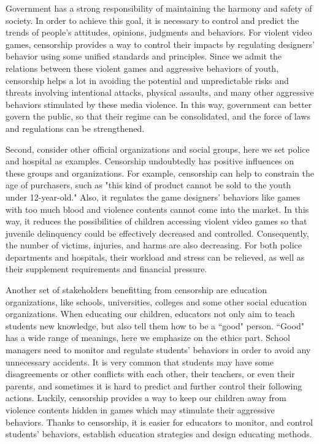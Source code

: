 Government has a strong responsibility of maintaining the harmony and safety of society. In order to achieve this goal, it is necessary to control and predict the trends of people's attitudes, opinions, judgments and behaviors. For violent video games, censorship provides a way to control their impacts by regulating designers' behavior using some unified standards and principles. Since we admit the relations between these violent games and aggressive behaviors of youth, censorship helps a lot in avoiding the potential and unpredictable risks and threats involving intentional attacks, physical assaults, and many other aggressive behaviors stimulated by these media violence. In this way, government can better govern the public, so that their regime can be consolidated, and the force of laws and regulations can be strengthened.

Second, consider other official organizations and social groups, here we set police and hospital as examples. Censorship undoubtedly has positive influences on these groups and organizations. For example, censorship can help to constrain the age of purchasers, such as "this kind of product cannot be sold to the youth under 12-year-old." Also, it regulates the game designers' behaviors like games with too much blood and violence contents cannot come into the market. In this way, it reduces the possibilities of children accessing violent video games so that juvenile delinquency could be effectively decreased and controlled. Consequently, the number of victims, injuries, and harms are also decreasing. For both police departments and hospitals, their workload and stress can be relieved, as well as their supplement requirements and financial pressure.

Another set of stakeholders benefitting from censorship are education organizations, like schools, universities, colleges and some other social education organizations. When educating our children, educators not only aim to teach students new knowledge, but also tell them how to be a ``good" person. ``Good" has a wide range of meanings, here we emphasize on the ethics part. School managers need to monitor and regulate students' behaviors in order to avoid any unnecessary accidents. It is very common that students may have some disagreements or other conflicts with each other, their teachers, or even their parents, and sometimes it is hard to predict and further control their following actions. Luckily, censorship provides a way to keep our children away from violence contents hidden in games which may stimulate their aggressive behaviors. Thanks to censorship, it is easier for educators to monitor, and control students' behaviors, establish education strategies and design educating methods. 

